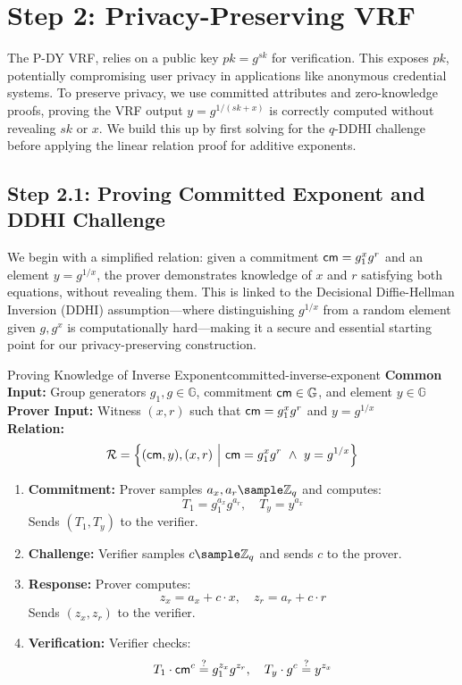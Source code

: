 \newpage
\section{Step 2: Privacy-Preserving VRF}

The P-DY VRF, relies on a public key $pk = g^{sk}$ for verification. This exposes $pk$, potentially compromising user privacy in applications like anonymous credential systems. To preserve privacy, we use committed attributes and zero-knowledge proofs, proving the VRF output $y = g^{1/(sk + x)}$ is correctly computed without revealing $sk$ or $x$. We build this up by first solving for the $q$-DDHI challenge before applying the linear relation proof for additive exponents. 

\subsection{Step 2.1: Proving Committed Exponent and DDHI Challenge}

We begin with a simplified relation: given a commitment $\mathsf{cm} = g_1^x g^r$ and an element $y = g^{1/x}$, the prover demonstrates knowledge of $x$ and $r$ satisfying both equations, without revealing them. This is linked to the Decisional Diffie-Hellman Inversion (DDHI) assumption—where distinguishing $g^{1/x}$ from a random element given $g, g^x$ is computationally hard—making it a secure and essential starting point for our privacy-preserving construction.

\begin{protocol}{Proving Knowledge of Inverse Exponent}{committed-inverse-exponent}\label{pok-committed-inverse-exponent}
\textbf{Common Input:} Group generators $g_1, g \in \mathbb{G}$, commitment $\mathsf{cm} \in \mathbb{G}$, and element $y \in \mathbb{G}$ \\
\textbf{Prover Input:} Witness $(x, r)$ such that $\mathsf{cm} = g_1^x g^r$ and $y = g^{1/x}$ \\
\textbf{Relation:} 
\[
\mathcal{R} = \left\{ (\mathsf{cm}, y), (x, r) \ \middle|\ \mathsf{cm} = g_1^x g^r \ \land\ y = g^{1/x} \right\}
\]
\begin{enumerate}
    \item \textbf{Commitment:} Prover samples $a_x, a_r \sample \mathbb{Z}_q$ and computes:
    \[
    T_1 = g_1^{a_x} g^{a_r}, \quad T_y = y^{a_x}
    \]
    Sends $(T_1, T_y)$ to the verifier.

    \item \textbf{Challenge:} Verifier samples $c  \sample  \mathbb{Z}_q$ and sends $c$ to the prover.

    \item \textbf{Response:} Prover computes:
    \[
    z_x = a_x + c \cdot x, \quad z_r = a_r + c \cdot r
    \]
    Sends $(z_x, z_r)$ to the verifier.

    \item \textbf{Verification:} Verifier checks:
    \[
    T_1 \cdot \mathsf{cm}^c \stackrel{?}{=} g_1^{z_x} g^{z_r}, \quad T_y \cdot g^c \stackrel{?}{=} y^{z_x}
    \]
\end{enumerate}
\end{protocol}

